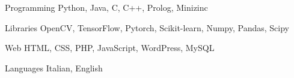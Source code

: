 

\begin{cvskills}

  \cvskill
    {Programming} %
    {Python, Java, C, C++, Prolog, Minizinc} %

  \cvskill
    {Libraries} %
    {OpenCV, TensorFlow, Pytorch, Scikit-learn, Numpy, Pandas, Scipy} %

  \cvskill
    {Web} %
    {HTML, CSS, PHP, JavaScript, WordPress, MySQL} %

  \cvskill
    {Languages} %
    {Italian, English} %

\end{cvskills}
